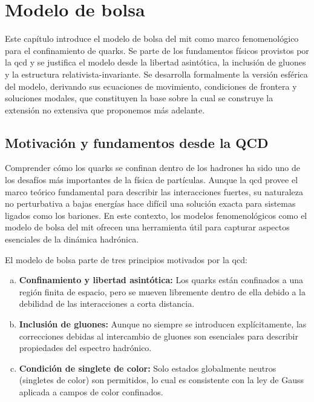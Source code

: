 \chapter{Modelo de bolsa}
\label{ch-BagModel}

\pagestyle{fancy}
\fancyhf{}
\fancyhead[LE]{\nouppercase{\textbf{\leftmark}\hfill\textit{\rightmark}}}
\fancyhead[RO]{\nouppercase{\textit{\rightmark}\hfill\textbf{\leftmark}}}

\begin{chaptersummary}
    Este capítulo introduce el modelo de bolsa del \gls{mit} como marco fenomenológico para el confinamiento de quarks. Se parte de los fundamentos físicos provistos por la \gls{qcd} y se justifica el modelo desde la libertad asintótica, la inclusión de gluones y la estructura relativista-invariante. Se desarrolla formalmente la versión esférica del modelo, derivando sus ecuaciones de movimiento, condiciones de frontera y soluciones modales, que constituyen la base sobre la cual se construye la extensión no extensiva que proponemos más adelante.
\end{chaptersummary}
    
\section{Motivación y fundamentos desde la QCD}
    
Comprender cómo los quarks se confinan dentro de los hadrones ha sido uno de los desafíos más importantes de la física de partículas. Aunque la \gls{qcd} provee el marco teórico fundamental para describir las interacciones fuertes, su naturaleza no perturbativa a bajas energías hace difícil una solución exacta para sistemas ligados como los bariones. En este contexto, los modelos fenomenológicos como el modelo de bolsa del \gls{mit} ofrecen una herramienta útil para capturar aspectos esenciales de la dinámica hadrónica.
    
El modelo de bolsa parte de tres principios motivados por la \gls{qcd}:
    
\begin{enumerate}[a)]
\item \textbf{Confinamiento y libertad asintótica:} Los quarks están confinados a una región finita de espacio, pero se mueven libremente dentro de ella debido a la debilidad de las interacciones a corta distancia.
\item \textbf{Inclusión de gluones:} Aunque no siempre se introducen explícitamente, las correcciones debidas al intercambio de gluones son esenciales para describir propiedades del espectro hadrónico.
\item \textbf{Condición de singlete de color:} Solo estados globalmente neutros (singletes de color) son permitidos, lo cual es consistente con la ley de Gauss aplicada a campos de color confinados.
\end{enumerate}
    
